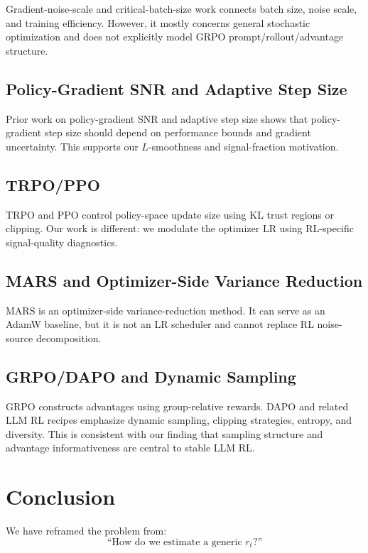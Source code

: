 \documentclass[11pt,a4paper]{article}
\begin{document}
Gradient-noise-scale and critical-batch-size work connects batch size, noise scale, and training efficiency. However, it mostly concerns general stochastic optimization and does not explicitly model GRPO prompt/rollout/advantage structure.

\subsection{Policy-Gradient SNR and Adaptive Step Size}

Prior work on policy-gradient SNR and adaptive step size shows that policy-gradient step size should depend on performance bounds and gradient uncertainty. This supports our \(L\)-smoothness and signal-fraction motivation.

\subsection{TRPO/PPO}

TRPO and PPO control policy-space update size using KL trust regions or clipping. Our work is different: we modulate the optimizer LR using RL-specific signal-quality diagnostics.

\subsection{MARS and Optimizer-Side Variance Reduction}

MARS is an optimizer-side variance-reduction method. It can serve as an AdamW baseline, but it is not an LR scheduler and cannot replace RL noise-source decomposition.

\subsection{GRPO/DAPO and Dynamic Sampling}

GRPO constructs advantages using group-relative rewards. DAPO and related LLM RL recipes emphasize dynamic sampling, clipping strategies, entropy, and diversity. This is consistent with our finding that sampling structure and advantage informativeness are central to stable LLM RL.

\section{Conclusion}

We have reframed the problem from:
\[
\text{``How do we estimate a generic } r_t \text{?''}
\]
\end{document}
